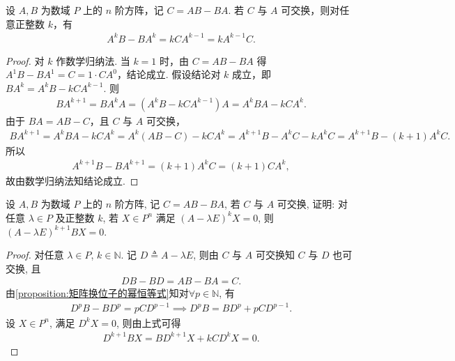 \documentclass[../../main.tex]{subfiles}%
\begin{document}
\begin{proposition}\label{proposition:矩阵换位子的幂恒等式}
设 \(A,B\) 为数域 \(P\) 上的 \(n\) 阶方阵，记 \(C=AB-BA\). 若 \(C\) 与 \(A\) 可交换，则对任意正整数 \(k\)，有
\begin{align*}
A^kB-BA^k=kCA^{k-1}=kA^{k-1}C.
\end{align*}
\end{proposition}
\begin{proof}
对 \(k\) 作数学归纳法.
当 \(k=1\) 时，由 \(C=AB-BA\) 得 \(A^1B-BA^1=C=1\cdot C A^{0}\)，结论成立.
假设结论对 \(k\) 成立，即 \(BA^k=A^kB-kCA^{k-1}\). 则
\begin{align*}
BA^{k+1}=BA^kA=(A^kB-kCA^{k-1})A =A^kBA-kCA^{k}.
\end{align*}
由于 \(BA=AB-C\)，且 \(C\) 与 \(A\) 可交换，
\begin{align*}
BA^{k+1}=A^kBA-kCA^k=A^k\left( AB-C \right) -kCA^k
=A^{k+1}B-A^kC-kA^kC=A^{k+1}B-(k+1)A^kC.
\end{align*}
所以
\begin{align*}
A^{k+1}B-BA^{k+1}=(k+1)A^kC=(k+1)CA^k,
\end{align*}
故由数学归纳法知结论成立.
\end{proof}

\begin{example}
设 $A,B$ 为数域 $P$ 上的 $n$ 阶方阵, 记 $C = AB - BA$, 若 $C$ 与 $A$ 可交换, 证明: 对任意 $\lambda \in P$ 及正整数 $k$, 若 $X \in P^n$ 满足 $(A-\lambda E)^k X = 0$, 则 $(A-\lambda E)^{k+1} BX = 0$.
\end{example}
\begin{proof}
对任意 $\lambda \in P$, $k\in \mathbb{N}$. 记 $D \triangleq A - \lambda E$, 则由 $C$ 与 $A$ 可交换知 $C$ 与 $D$ 也可交换, 且
\begin{align*}
DB - BD = AB - BA = C.
\end{align*}
由\cref{proposition:矩阵换位子的幂恒等式}知对$\forall p\in \mathbb{N}$, 有
\begin{align*}
D^p B - B D^p = p C D^{p-1} \implies D^p B = B D^p + p C D^{p-1}.
\end{align*}
设 $X\in P^n$, 满足 $D^k X = 0$, 则由上式可得
\begin{align*}
D^{k+1} BX = B D^{k+1} X + k C D^k X = 0.
\end{align*}
\end{proof}
\end{document}

